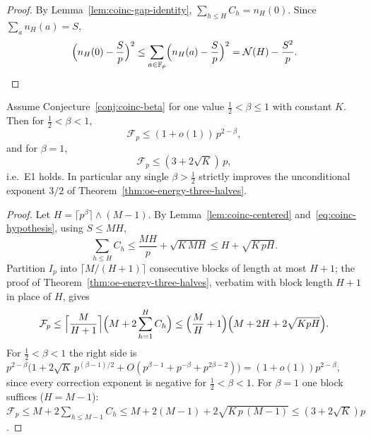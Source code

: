 \begin{proof}
By Lemma~\ref{lem:coinc-gap-identity}, $\sum_{h\le H}C_h=n_H(0)$.  Since
$\sum_an_H(a)=S$,
\[
 \Bigl(n_H(0)-\frac Sp\Bigr)^2
 \le\sum_{a\in\mathbb F_p}\Bigl(n_H(a)-\frac Sp\Bigr)^2
 =\mathcal N(H)-\frac{S^2}p .
\]
\end{proof}

\begin{theorem}
\label{thm:coinc-energy}
Assume Conjecture~\ref{conj:coinc-beta} for one value
$\tfrac12<\beta\le1$ with constant $K$.  Then for $\tfrac12<\beta<1$,
\[
 \mathcal F_p\le(1+o(1))\,p^{2-\beta},
\]
and for $\beta=1$,
\[
 \mathcal F_p\le(3+2\sqrt K)\,p ,
\]
i.e.\ E1 holds.  In particular any single $\beta>\tfrac12$ strictly
improves the unconditional exponent $3/2$ of
Theorem~\ref{thm:oe-energy-three-halves}.
\end{theorem}

\begin{proof}
Let $H=\lceil p^\beta\rceil\wedge(M-1)$.
By Lemma~\ref{lem:coinc-centered} and~\eqref{eq:coinc-hypothesis},
using $S\le MH$,
\begin{equation}\label{eq:coinc-linear-sum}
 \sum_{h\le H}C_h\le\frac{MH}p+\sqrt{K\,MH}\le H+\sqrt{K\,pH}.
\end{equation}
Partition $I_p$ into $\lceil M/(H+1)\rceil$ consecutive blocks of length
at most $H+1$; the proof of Theorem~\ref{thm:oe-energy-three-halves},
verbatim with block length $H+1$ in place of $H$, gives
\[
 \mathcal F_p\le
 \Bigl\lceil\frac M{H+1}\Bigr\rceil
 \Bigl(M+2\sum_{h=1}^{H}C_h\Bigr)
 \le\Bigl(\frac MH+1\Bigr)
 \Bigl(M+2H+2\sqrt{KpH}\Bigr).
\]
For $\tfrac12<\beta<1$ the right side is
$p^{2-\beta}\bigl(1+2\sqrt K\,p^{(\beta-1)/2}+O(p^{\beta-1}+p^{-\beta}+p^{2\beta-2})\bigr)
=(1+o(1))p^{2-\beta}$, since every correction exponent is negative for
$\tfrac12<\beta<1$.  For $\beta=1$ one block suffices ($H=M-1$):
$\mathcal F_p\le M+2\sum_{h\le M-1}C_h\le M+2(M-1)+2\sqrt{K\,p\,(M-1)}
\le(3+2\sqrt K)p$.
\end{proof}


